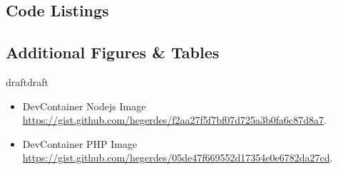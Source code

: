 \documentclass[12pt, a4paper]{article}
\def\draft{draft}
\def\status{draft}
\begin{document}
\newpage

\singlespacing{}
\renewcommand{\thesubsection}{\Alph{subsection}}
\setcounter{page}{\value{lastroman}}



\newpage

\vspace*{\fill}
\vspace*{\fill}



\subsection{Code Listings}


\newpage

\subsection{Additional Figures \& Tables}
\ifx\status\draft{}
    
\fi
\newpage



\listoffigures
\listoftables
\lstlistoflistings{}
\vspace{-0.5cm}
\begin{itemize}
    \item DevContainer Nodejs Image  \\ \href{https://gist.github.com/hegerdes/f2aa27f5f7bf07d725a3b0fa6c87d8a7}{https://gist.github.com/hegerdes/f2aa27f5f7bf07d725a3b0fa6c87d8a7}.
    \item DevContainer PHP Image  \\ \href{https://gist.github.com/hegerdes/05de47f669552d17354e0e6782da27cd}{https://gist.github.com/hegerdes/05de47f669552d17354e0e6782da27cd}.
\end{itemize}

\newpage


% 
\end{document}
